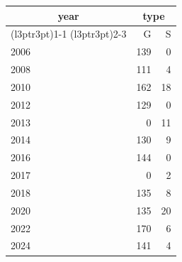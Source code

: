 \footnotesize\begin{tabular}[t]{lrr}
\toprule
\multicolumn{1}{c}{year} & \multicolumn{2}{c}{type} \\
\cmidrule(l{3pt}r{3pt}){1-1} \cmidrule(l{3pt}r{3pt}){2-3}
  & G & S\\
\midrule
2006 & 139 & 0\\
2008 & 111 & 4\\
2010 & 162 & 18\\
2012 & 129 & 0\\
2013 & 0 & 11\\
2014 & 130 & 9\\
2016 & 144 & 0\\
2017 & 0 & 2\\
2018 & 135 & 8\\
2020 & 135 & 20\\
2022 & 170 & 6\\
2024 & 141 & 4\\
\bottomrule
\end{tabular}
